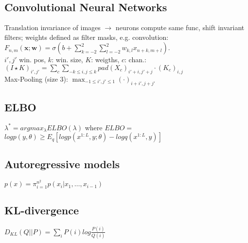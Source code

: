 \subsection*{Convolutional Neural Networks}
Translation invariance of images $\rightarrow$ neurons compute same func, shift invariant filters; weights defined as filter masks, e.g. convolution: $F_{n,m}(\mathbf{x};\mathbf{w}) = \sigma(b + \sum_{k=-2}^2\sum_{l=-2}^{2}{w_{k,l}x_{n+k,m+l}})$.\\
$i',j'$ win. pos, $k$: win. size, $K$: weigths, $c$: chan.:\\
 $(I\star K)_{i', j'} = \sum_c \sum_{-k\leq i,j \leq k} pad(X_c)_{i'+i,j'+j} \cdot(K_c)_{i,j}$\\
Max-Pooling (size 3): $\max_{-1\leq i', j' \leq 1}(\cdot)_{i+i', j+j'}$ %

\subsection*{ELBO}
$\lambda^* = argmax_\lambda ELBO(\lambda)$ where $ELBO=$\\
$log p(y,\theta) \geq E_q[log p(x^{1:L},y; \theta)-log q(x^{1:L}, y)]$

\subsection*{Autoregressive models}
$p(x)=\pi_{i=1}^{n^2} p(x_i|x_1,\dots ,x_{i-1})$
\subsection*{KL-divergence}
$D_{KL}(Q||P) = \sum_i P(i)log\frac{P(i)}{Q(i)}$
